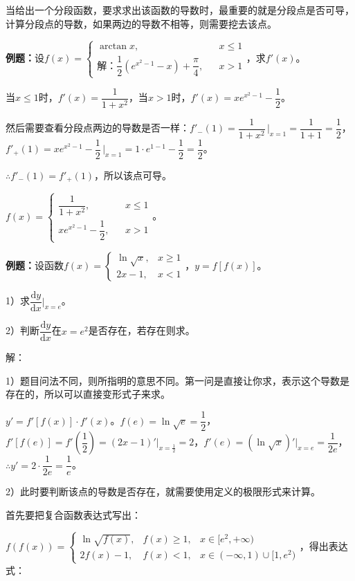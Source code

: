 当给出一个分段函数，要求求出该函数的导数时，最重要的就是分段点是否可导，计算分段点的导数，如果两边的导数不相等，则需要挖去该点。\medskip

\textbf{例题：}设$f(x)=\left\{\begin{array}{lcl}
    \arctan x, & & x\leqslant 1 \\
解：    \dfrac{1}{2}(e^{x^2-1}-x)+\dfrac{\pi}{4}, & & x>1
\end{array}
\right.$，求$f'(x)$。

当$x\leqslant 1$时，$f'(x)=\dfrac{1}{1+x^2}$，当$x>1$时，$f'(x)=xe^{x^2-1}-\dfrac{1}{2}$。

然后需要查看分段点两边的导数是否一样：$f'_-(1)=\dfrac{1}{1+x^2}\,\bigg\vert_{x=1}=\dfrac{1}{1+1}=\dfrac{1}{2}$，$f'_+(1)=xe^{x^2-1}-\dfrac{1}{2}\,\bigg\vert_{x=1}=1\cdot e^{1-1}-\dfrac{1}{2}=\dfrac{1}{2}$。\medskip

$\therefore f'_-(1)=f'_+(1)$，所以该点可导。\medskip

$f(x)=\left\{\begin{array}{lcl}
    \dfrac{1}{1+x^2}, & & x\leqslant 1 \\
    xe^{x^2-1}-\dfrac{1}{2}, & & x>1
\end{array}
\right.$。

\textbf{例题：}设函数$f(x)=\left\{\begin{array}{ll}
    \ln\sqrt{x}, & x\geqslant1\\
    2x-1, &x<1
\end{array}\right.$，$y=f[f(x)]$。

1）求$\dfrac{\textrm{d}y}{\textrm{d}x}\bigg\vert_{x=e}$。

2）判断$\dfrac{\textrm{d}y}{\textrm{d}x}$在$x=e^2$是否存在，若存在则求。

解：

1）题目问法不同，则所指明的意思不同。第一问是直接让你求，表示这个导数是存在的，所以可以直接变形式子来求。

$y'=f'[f(x)]\cdot f'(x)$。$f(e)=\ln\sqrt{e}=\dfrac{1}{2}$，$f'[f(e)]=f'\left(\dfrac{1}{2}\right)=(2x-1)'\vert_{x=\frac{1}{2}}=2$，$f'(e)=(\ln\sqrt{x})'\vert_{x=e}=\dfrac{1}{2e}$，$\therefore y'=2\cdot\dfrac{1}{2e}=\dfrac{1}{e}$。

2）此时要判断该点的导数是否存在，就需要使用定义的极限形式来计算。

首先要把复合函数表达式写出：\medskip

$f(f(x))=\left\{\begin{array}{lll}
    \ln\sqrt{f(x)}, & f(x)\geqslant1, & x\in[e^2,+\infty) \\
    2f(x)-1, & f(x)<1, & x\in(-\infty,1)\cup[1,e^2)
\end{array}\right.$，得出表达式：

